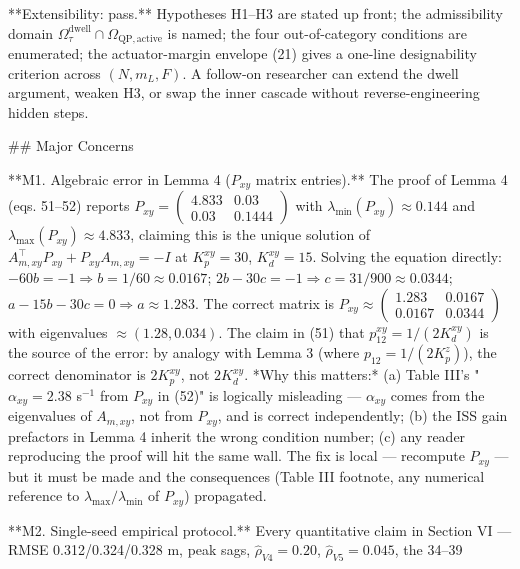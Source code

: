**Extensibility: pass.** Hypotheses H1–H3 are stated up front; the admissibility domain $\Omega_\tau^{\mathrm{dwell}} \cap \Omega_{\mathrm{QP,active}}$ is named; the four out-of-category conditions are enumerated; the actuator-margin envelope (21) gives a one-line designability criterion across $(N, m_L, F)$. A follow-on researcher can extend the dwell argument, weaken H3, or swap the inner cascade without reverse-engineering hidden steps.

## Major Concerns

**M1. Algebraic error in Lemma 4 ($P_{xy}$ matrix entries).** The proof of Lemma 4 (eqs. 51–52) reports $P_{xy} = \begin{pmatrix} 4.833 & 0.03 \\ 0.03 & 0.1444 \end{pmatrix}$ with $\lambda_{\min}(P_{xy}) \approx 0.144$ and $\lambda_{\max}(P_{xy}) \approx 4.833$, claiming this is the unique solution of $A_{m,xy}^\top P_{xy} + P_{xy} A_{m,xy} = -I$ at $K_p^{xy}=30$, $K_d^{xy}=15$. Solving the equation directly: $-60 b = -1 \Rightarrow b = 1/60 \approx 0.0167$; $2b - 30c = -1 \Rightarrow c = 31/900 \approx 0.0344$; $a - 15b - 30c = 0 \Rightarrow a \approx 1.283$. The correct matrix is $P_{xy} \approx \begin{pmatrix} 1.283 & 0.0167 \\ 0.0167 & 0.0344 \end{pmatrix}$ with eigenvalues $\approx (1.28, 0.034)$. The claim in (51) that $p_{12}^{xy} = 1/(2K_d^{xy})$ is the source of the error: by analogy with Lemma 3 (where $p_{12} = 1/(2K_p^z)$), the correct denominator is $2K_p^{xy}$, not $2K_d^{xy}$. *Why this matters:* (a) Table III's "$\alpha_{xy} = 2.38$ s$^{-1}$ from $P_{xy}$ in (52)" is logically misleading — $\alpha_{xy}$ comes from the eigenvalues of $A_{m,xy}$, not from $P_{xy}$, and is correct independently; (b) the ISS gain prefactors in Lemma 4 inherit the wrong condition number; (c) any reader reproducing the proof will hit the same wall. The fix is local — recompute $P_{xy}$ — but it must be made and the consequences (Table III footnote, any numerical reference to $\lambda_{\max}/\lambda_{\min}$ of $P_{xy}$) propagated.

**M2. Single-seed empirical protocol.** Every quantitative claim in Section VI — RMSE 0.312/0.324/0.328 m, peak sags, $\hat\rho_{V4}=0.20$, $\hat\rho_{V5}=0.045$, the 34–39%

